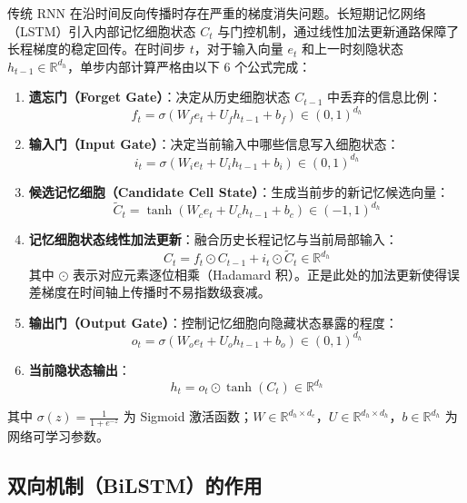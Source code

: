 \documentclass[11pt,a4paper]{ctexart}
\begin{document}
传统 RNN 在沿时间反向传播时存在严重的梯度消失问题。长短期记忆网络（LSTM）引入内部记忆细胞状态 $C_t$ 与门控机制，通过线性加法更新通路保障了长程梯度的稳定回传。在时间步 $t$，对于输入向量 $e_t$ 和上一时刻隐状态 $h_{t-1} \in \mathbb{R}^{d_h}$，单步内部计算严格由以下 6 个公式完成：
\begin{enumerate}
    \item \textbf{遗忘门（Forget Gate）}：决定从历史细胞状态 $C_{t-1}$ 中丢弃的信息比例：
    \begin{equation}
        f_t = \sigma(W_f e_t + U_f h_{t-1} + b_f) \in (0, 1)^{d_h}
    \end{equation}
    \item \textbf{输入门（Input Gate）}：决定当前输入中哪些信息写入细胞状态：
    \begin{equation}
        i_t = \sigma(W_i e_t + U_i h_{t-1} + b_i) \in (0, 1)^{d_h}
    \end{equation}
    \item \textbf{候选记忆细胞（Candidate Cell State）}：生成当前步的新记忆候选向量：
    \begin{equation}
        \tilde{C}_t = \tanh(W_c e_t + U_c h_{t-1} + b_c) \in (-1, 1)^{d_h}
    \end{equation}
    \item \textbf{记忆细胞状态线性加法更新}：融合历史长程记忆与当前局部输入：
    \begin{equation}
        C_t = f_t \odot C_{t-1} + i_t \odot \tilde{C}_t \in \mathbb{R}^{d_h}
    \end{equation}
    其中 $\odot$ 表示对应元素逐位相乘（Hadamard 积）。正是此处的加法更新使得误差梯度在时间轴上传播时不易指数级衰减。
    \item \textbf{输出门（Output Gate）}：控制记忆细胞向隐藏状态暴露的程度：
    \begin{equation}
        o_t = \sigma(W_o e_t + U_o h_{t-1} + b_o) \in (0, 1)^{d_h}
    \end{equation}
    \item \textbf{当前隐状态输出}：
    \begin{equation}
        h_t = o_t \odot \tanh(C_t) \in \mathbb{R}^{d_h}
    \end{equation}
\end{enumerate}

其中 $\sigma(z) = \frac{1}{1 + e^{-z}}$ 为 Sigmoid 激活函数；$W \in \mathbb{R}^{d_h \times d_e}$，$U \in \mathbb{R}^{d_h \times d_h}$，$b \in \mathbb{R}^{d_h}$ 为网络可学习参数。

\subsection{双向机制（BiLSTM）的作用}
\end{document}
